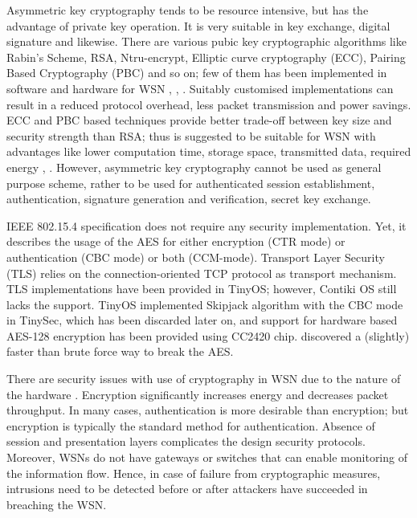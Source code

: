 \documentclass[conference,final]{IEEEtran}
\newcommand{\todo}[1]{\pdfmarkupcomment[markup=Highlight,color=red]{#1}{todo}}
\begin{document}
Asymmetric key cryptography tends to be resource intensive, but has the advantage of private key operation.
It is very suitable in key exchange, digital signature and likewise. 
There are various pubic key cryptographic algorithms like Rabin's Scheme,  RSA, Ntru-encrypt, Elliptic curve cryptography (ECC), Pairing Based Cryptography (PBC) and so on; few of them has been implemented in software and hardware for WSN \cite{ISI:000290947700017}, \cite{ISI:000312683300029}, \cite{ISI:000328624800002}. %
Suitably customised implementations can result in a reduced protocol overhead, less packet transmission and power savings.
ECC and PBC based techniques provide better trade-off  between  key size and security strength than RSA; thus is suggested to be suitable for WSN with advantages like lower computation time, storage space, transmitted data, required energy \cite{Liu:2008:TCL:1371607.1372738}, \cite{Oliveira:2011:TPA:1930560.1931219}. %
However, asymmetric key cryptography  cannot be used as general purpose scheme, rather to be used for authenticated session establishment, authentication, signature generation and verification, secret key exchange.

IEEE 802.15.4 specification does not require any security implementation. 
Yet, it describes the usage of the AES for either encryption (CTR mode) or authentication (CBC mode) or both (CCM-mode).
Transport Layer Security (TLS) relies on the connection-oriented TCP protocol as transport mechanism.  
TLS implementations have been provided in TinyOS; however, Contiki OS still lacks the support. \todo{NEED TO CHECK Contiki ASSERTION}
TinyOS implemented Skipjack algorithm with the CBC mode in TinySec, which has been discarded later on, and support for  hardware based AES-128 encryption has been provided using CC2420 chip.
\cite{ISI:000308844100019}  discovered a (slightly) faster than brute force way to break the AES.  %

There are security issues with use of cryptography in WSN due to the nature of the hardware \cite{1710}.
Encryption significantly increases energy and decreases packet throughput.
In many cases, authentication is more desirable than encryption; but encryption is typically the standard method for authentication.
Absence of session and presentation layers complicates the design security protocols.  %
Moreover, WSNs do not have gateways or switches that can enable monitoring of the information flow.
Hence, in case of failure from cryptographic measures, intrusions need to be detected before or after attackers have succeeded in breaching the WSN. 
\end{document}
